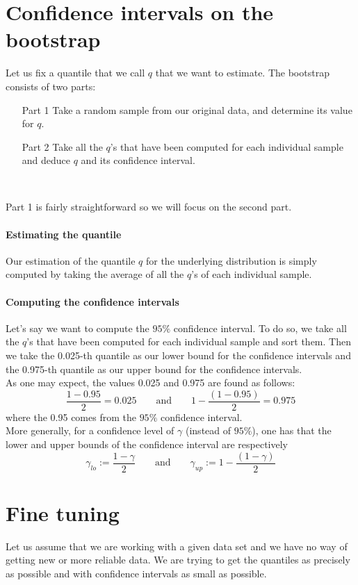 \documentclass{article}
\begin{document}
\section{Confidence intervals on the bootstrap}
\label{section: confidence intervals on the bootstrap}

Let us fix a quantile that we call $q$ that we want to estimate. The bootstrap consists of two parts:

\begin{enumerate}
    \item[Part 1] Take a random sample from our original data, and determine its value for $q$.
    \item[Part 2] Take all the $q$'s that have been computed for each individual sample and deduce $q$ and its confidence interval.
\end{enumerate}\

Part 1 is fairly straightforward so we will focus on the second part.

\paragraph{Estimating the quantile} Our estimation of the quantile $q$ for the underlying distribution is simply computed by taking the average of all the $q$'s of each individual sample.

\paragraph{Computing the confidence intervals} Let's say we want to compute the $95\%$ confidence interval. To do so, we take all the $q$'s that have been computed for each individual sample and sort them. Then we take the 0.025-th quantile as our lower bound for the confidence intervals and the 0.975-th quantile as our upper bound for the confidence intervals. \\
As one may expect, the values 0.025 and 0.975 are found as follows:
\[
    \frac{1 - 0.95}{2} = 0.025 \qquad \mbox{and} \qquad 1 - \frac{(1 - 0.95)}{2} = 0.975
\]
where the 0.95 comes from the $95\%$ confidence interval. \\
More generally, for a confidence level of $\gamma$ (instead of $95\%$), one has that the lower and upper bounds of the confidence interval are respectively
\[
    \gamma_{lo} := \frac{1 - \gamma}{2} \qquad \mbox{and} \qquad \gamma_{up} := 1 - \frac{(1 - \gamma)}{2}
\]

\section{Fine tuning}
Let us assume that we are working with a given data set and we have no way of getting new or more reliable data. We are trying to get the quantiles as precisely as possible and with confidence intervals as small as possible.
\end{document}
